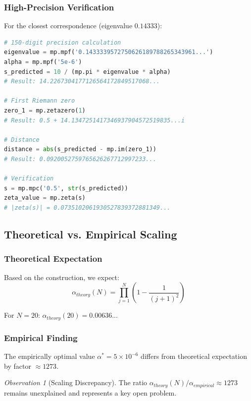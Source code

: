 \documentclass[12pt,letterpaper]{article}
\theoremstyle{plain}
\theoremstyle{definition}
\theoremstyle{remark}
\newtheorem{observation}[theorem]{Observation}
\begin{document}
\subsubsection{High-Precision Verification}

For the closest correspondence (eigenvalue $0.14333$):

\begin{lstlisting}[language=Python]
# 150-digit precision calculation
eigenvalue = mp.mpf('0.1433339572750626189788265343961...')
alpha = mp.mpf('5e-6')
s_predicted = 10 / (mp.pi * eigenvalue * alpha)
# Result: 14.2267304177126564172849517068...

# First Riemann zero
zero_1 = mp.zetazero(1)
# Result: 0.5 + 14.1347251417346937904572519835...i

# Distance
distance = abs(s_predicted - mp.im(zero_1))
# Result: 0.0920052759765626267712997233...

# Verification
s = mp.mpc('0.5', str(s_predicted))
zeta_value = mp.zeta(s)
# |zeta(s)| = 0.0735102061930527839372881349...
\end{lstlisting}

\subsection{Theoretical vs. Empirical Scaling}

\subsubsection{Theoretical Expectation}

Based on the construction, we expect:
\begin{equation}
\alpha_{theory}(N) = \prod_{j=1}^N \left(1 - \frac{1}{(j+1)^2}\right)
\end{equation}

For $N = 20$: $\alpha_{theory}(20) = 0.00636...$

\subsubsection{Empirical Finding}

The empirically optimal value $\alpha^* = 5 \times 10^{-6}$ differs from theoretical expectation by factor $\approx 1273$.

\begin{observation}[Scaling Discrepancy]\label{obs:scaling_discrepancy}
The ratio $\alpha_{theory}(N)/\alpha_{empirical} \approx 1273$ remains unexplained and represents a key open problem.
\end{observation}
\end{document}
